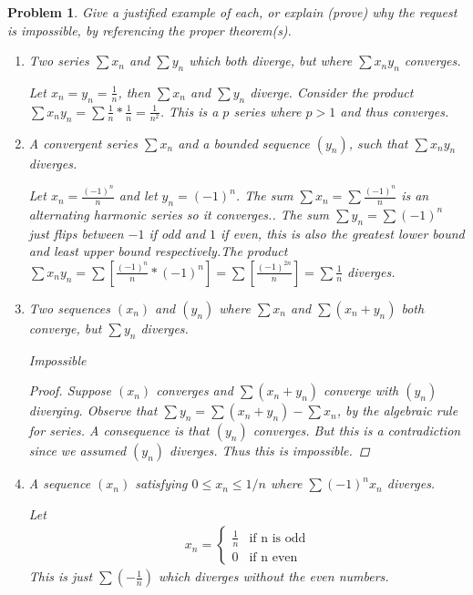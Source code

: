 \documentclass[12pt]{article}
\newtheorem{problem}{Problem}
\begin{document}
\begin{problem} %
Give a justified example of each, or explain (prove) why the request is impossible, by referencing the proper theorem(s).

\renewcommand{\labelenumi}{(\alph{enumi})}
\begin{enumerate}
\item Two series $\sum x_n$ and $\sum y_n$ which both diverge, but where $\sum x_n y_n$ converges.

  Let $x_n = y_n = \frac{1}{n}$, then $\sum x_n$ and $\sum y_n$ diverge. Consider the product $\sum x_n y_n = \sum \frac{1}{n} * \frac{1}{n} = \frac{1}{n^2}$.
  This is a $p$ series where $p > 1$ and thus converges.

\item A convergent series $\sum x_n$ and a bounded sequence $(y_n)$, such that $\sum x_n y_n$ diverges.

  Let $x_n = \frac{(-1)^n}{n}$ and let $y_n = (-1)^n$. The sum $\sum x_n = \sum \frac{(-1)^n}{n}$ is an alternating harmonic series so it converges.. The sum $\sum y_n = \sum (-1)^n$ just flips between $-1$ if odd and $1$ if even, this is also the greatest lower bound and least upper bound respectively.The product $\sum x_ny_n = \sum [\frac{(-1)^n}{n} * (-1)^n] =  \sum [\frac{(-1)^{2n}}{n}] = \sum \frac{1}{n} $ diverges.

\item Two sequences $(x_n)$ and $(y_n)$ where $\sum x_n$ and $\sum (x_n+y_n)$ both converge, but $\sum y_n$ diverges.

  Impossible
  \begin{proof}Suppose $(x_n)$ converges and $\sum (x_n + y_n)$ converge with $(y_n)$ diverging. Observe that $\sum y_n = \sum (x_n + y_n) - \sum x_n$, by the algebraic rule for series. A consequence is that $(y_n)$ converges. But this is a contradiction since we assumed $(y_n)$ diverges. Thus this is impossible. 
  \end{proof}

\item A sequence $(x_n)$ satisfying $0\le x_n \le 1/n$ where $\sum (-1)^n x_n$ diverges.

  Let 
  \begin{align*}x_n =
    \begin{cases}
      \frac{1}{n} & \text{if n is odd} \\
      0 & \text{if n even}
    \end{cases}
  \end{align*}
  This is just $\sum (-\frac{1}{n})$ which diverges without the even numbers.

\end{enumerate}
\end{problem}
\end{document}
